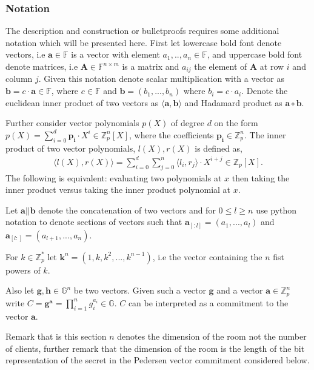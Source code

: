\subsubsection*{Notation}
The description and construction or bulletproofs requires some additional notation which will be presented here. First let lowercase bold font denote vectors, i.e $\mathbf{a}\in\mathds{F}$ is a vector with element $a_1,..,a_n \in \mathds{F}$, and uppercase bold font denote matrices, i.e $\mathbf{A}\in\mathds{F}^{n\times m}$ is a matrix and $a_{ij}$ the element of $\mathbf{A}$ at row $i$ and column $j$. Given this notation denote scalar multiplication with a vector as $\mathbf{b}=c\cdot \mathbf{a}\in\mathds{F}$, where $c\in\mathds{F}$ and $\mathbf{b}=(b_1,...,b_n)$ where $b_i=c\cdot a_i$. Denote the euclidean inner product of two vectors as $\langle \mathbf{a},\mathbf{b}\rangle$ and Hadamard product as $\mathbf{a}\circ \mathbf{b}$.

Further consider vector polynomials $p(X)$ of degree $d$ on the form $p(X)=\sum_{i=0}^d \mathbf{p_i}\cdot X^i\in\mathds{Z}_p^n[X]$, where the coefficients $\mathbf{p_i}\in\mathds{Z}_p^n$. The inner product of two vector polynomials, $l(X),r(X)$ is defined as, 
\begin{align*}
    \langle l(X),r(X)\rangle = \sum_{i=0}^d\sum_{j=0}^n \langle l_i,r_j\rangle \cdot X^{i+j}\in\mathds{Z}_p[X].
\end{align*}
The following is equivalent: evaluating two polynomials at $x$ then taking the inner product versus taking the inner product polynomial at $x$.

Let $\mathbf{a}||\mathbf{b}$ denote the concatenation of two vectors and for $0\leq l\geq n$ use python notation to denote sections of vectors such that $\mathbf{a}_{[:l]} = (a_1,...,a_l)$ and $\mathbf{a}_{[l:]} = (a_{l+1},...,a_n)$. 

For $k\in\mathds{Z}_p^*$ let $\mathbf{k}^n=(1,k,k^2,...,k^{n-1})$, i.e the vector containing the $n$ fist powers of $k$. 

Also let $\mathbf{g},\mathbf{h}\in\mathds{G}^n$ be two vectors. Given such a vector $\mathbf{g}$ and a vector $\mathbf{a}\in\mathds{Z}_p^n$ write $C= \mathbf{g}^\mathbf{a} = \prod_{i=1}^ng_i^{a_i}\in\mathds{G}$. $C$ can be interpreted as a commitment to the vector $\mathbf{a}$.

Remark that is this section $n$ denotes the dimension of the room not the number of clients, further remark that the dimension of the room is the length of the bit representation of the secret in the Pedersen vector commitment considered below. 

